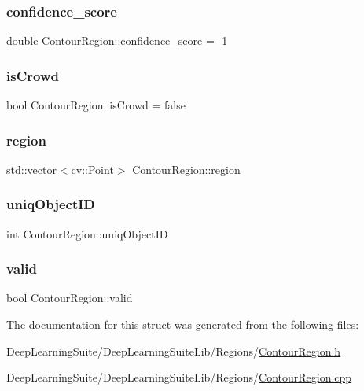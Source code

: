 \subsubsection{\texorpdfstring{confidence\+\_\+score}{confidence\_score}}
{\footnotesize\ttfamily double Contour\+Region\+::confidence\+\_\+score = -\/1}

\mbox{\label{struct_contour_region_a6bdf33777074f8498b55e3c89817906d}} 
\subsubsection{\texorpdfstring{is\+Crowd}{isCrowd}}
{\footnotesize\ttfamily bool Contour\+Region\+::is\+Crowd = false}

\mbox{\label{struct_contour_region_a638a84fef2113ccf2016f29273f6992d}} 
\subsubsection{\texorpdfstring{region}{region}}
{\footnotesize\ttfamily std\+::vector$<$cv\+::\+Point$>$ Contour\+Region\+::region}

\mbox{\label{struct_contour_region_a6b3027e2fcb6f62ec59d57073aac29ea}} 
\subsubsection{\texorpdfstring{uniq\+Object\+ID}{uniqObjectID}}
{\footnotesize\ttfamily int Contour\+Region\+::uniq\+Object\+ID}

\mbox{\label{struct_contour_region_a3b8236711736047f72242b486ca288da}} 
\subsubsection{\texorpdfstring{valid}{valid}}
{\footnotesize\ttfamily bool Contour\+Region\+::valid}



The documentation for this struct was generated from the following files\+:\begin{DoxyCompactItemize}
\item 
Deep\+Learning\+Suite/\+Deep\+Learning\+Suite\+Lib/\+Regions/\hyperlink{_contour_region_8h}{Contour\+Region.\+h}\item 
Deep\+Learning\+Suite/\+Deep\+Learning\+Suite\+Lib/\+Regions/\hyperlink{_contour_region_8cpp}{Contour\+Region.\+cpp}\end{DoxyCompactItemize}
